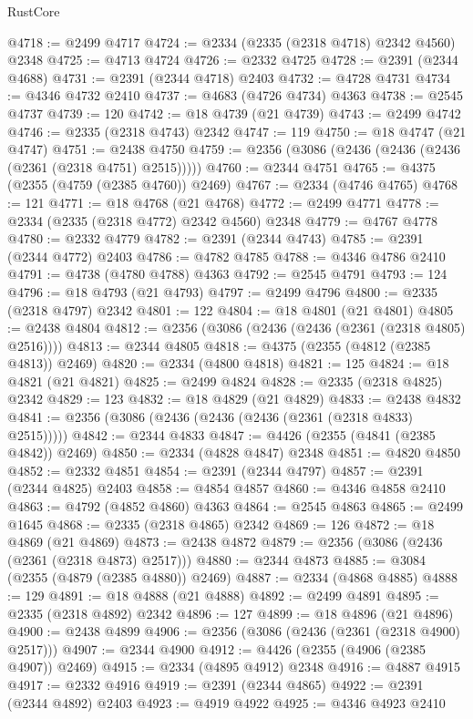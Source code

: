 \begin{lexlean}{RustCore}
\begin{coremodule}
@4718 := @2499 @4717
@4724 := @2334 (@2335 (@2318 @4718) @2342 @4560) @2348
@4725 := @4713 @4724
@4726 := @2332 @4725
@4728 := @2391 (@2344 @4688)
@4731 := @2391 (@2344 @4718) @2403
@4732 := @4728 @4731
@4734 := @4346 @4732 @2410
@4737 := @4683 (@4726 @4734) @4363
@4738 := @2545 @4737
@4739 := 120
@4742 := @18 @4739 (@21 @4739)
@4743 := @2499 @4742
@4746 := @2335 (@2318 @4743) @2342
@4747 := 119
@4750 := @18 @4747 (@21 @4747)
@4751 := @2438 @4750
@4759 := @2356 (@3086 (@2436 (@2436 (@2436 (@2361 (@2318 @4751) @2515)))))
@4760 := @2344 @4751
@4765 := @4375 (@2355 (@4759 (@2385 @4760)) @2469)
@4767 := @2334 (@4746 @4765)
@4768 := 121
@4771 := @18 @4768 (@21 @4768)
@4772 := @2499 @4771
@4778 := @2334 (@2335 (@2318 @4772) @2342 @4560) @2348
@4779 := @4767 @4778
@4780 := @2332 @4779
@4782 := @2391 (@2344 @4743)
@4785 := @2391 (@2344 @4772) @2403
@4786 := @4782 @4785
@4788 := @4346 @4786 @2410
@4791 := @4738 (@4780 @4788) @4363
@4792 := @2545 @4791
@4793 := 124
@4796 := @18 @4793 (@21 @4793)
@4797 := @2499 @4796
@4800 := @2335 (@2318 @4797) @2342
@4801 := 122
@4804 := @18 @4801 (@21 @4801)
@4805 := @2438 @4804
@4812 := @2356 (@3086 (@2436 (@2436 (@2361 (@2318 @4805) @2516))))
@4813 := @2344 @4805
@4818 := @4375 (@2355 (@4812 (@2385 @4813)) @2469)
@4820 := @2334 (@4800 @4818)
@4821 := 125
@4824 := @18 @4821 (@21 @4821)
@4825 := @2499 @4824
@4828 := @2335 (@2318 @4825) @2342
@4829 := 123
@4832 := @18 @4829 (@21 @4829)
@4833 := @2438 @4832
@4841 := @2356 (@3086 (@2436 (@2436 (@2436 (@2361 (@2318 @4833) @2515)))))
@4842 := @2344 @4833
@4847 := @4426 (@2355 (@4841 (@2385 @4842)) @2469)
@4850 := @2334 (@4828 @4847) @2348
@4851 := @4820 @4850
@4852 := @2332 @4851
@4854 := @2391 (@2344 @4797)
@4857 := @2391 (@2344 @4825) @2403
@4858 := @4854 @4857
@4860 := @4346 @4858 @2410
@4863 := @4792 (@4852 @4860) @4363
@4864 := @2545 @4863
@4865 := @2499 @1645
@4868 := @2335 (@2318 @4865) @2342
@4869 := 126
@4872 := @18 @4869 (@21 @4869)
@4873 := @2438 @4872
@4879 := @2356 (@3086 (@2436 (@2361 (@2318 @4873) @2517)))
@4880 := @2344 @4873
@4885 := @3084 (@2355 (@4879 (@2385 @4880)) @2469)
@4887 := @2334 (@4868 @4885)
@4888 := 129
@4891 := @18 @4888 (@21 @4888)
@4892 := @2499 @4891
@4895 := @2335 (@2318 @4892) @2342
@4896 := 127
@4899 := @18 @4896 (@21 @4896)
@4900 := @2438 @4899
@4906 := @2356 (@3086 (@2436 (@2361 (@2318 @4900) @2517)))
@4907 := @2344 @4900
@4912 := @4426 (@2355 (@4906 (@2385 @4907)) @2469)
@4915 := @2334 (@4895 @4912) @2348
@4916 := @4887 @4915
@4917 := @2332 @4916
@4919 := @2391 (@2344 @4865)
@4922 := @2391 (@2344 @4892) @2403
@4923 := @4919 @4922
@4925 := @4346 @4923 @2410

\end{coremodule}
\end{lexlean}
